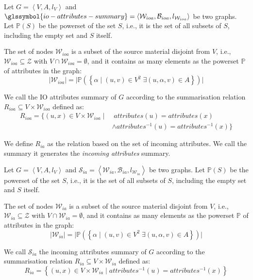 \begin{definition}
	Let $G=\left\langle V, A, l_V \right\rangle$ and $\glssymbol{io-attributes-summary} = \left\langle \mathcal{W}_{ioa}, \mathcal{B}_{ioa}, l_{\mathcal{W}_{ioa}} \right\rangle$ be two graphs. Let $\mathbb{P}(S)$ be the powerset of the set $S$, i.e., it is the set of all subsets of $S$, including the empty set and $S$ itself.

	The set of nodes $\mathcal{W}_{ioa}$ is a subset of the source material disjoint from $V$, i.e., $\mathcal{W}_{ioa} \subseteq \mathcal{Z}$ with $V \cap \mathcal{W}_{ioa} = \emptyset$, and it contains as many elements as the powerset $\mathbb{P}$ of attributes in the graph:
	$$
	\lvert \mathcal{W}_{ioa} \rvert = \lvert \mathbb{P}\left( \left\lbrace \alpha \mid (u, v) \in V^2\; \exists (u, \alpha, v) \in A \right\rbrace \right) \rvert
	$$

	We call  the IO attributes summary of $G$ according to the summarisation relation $R_{ioa} \subseteq V \times \mathcal{W}_{ioa}$ defined as:
	$$
	\begin{aligned}
	R_{ioa} =
	\{
	(u, x) \in V \times \mathcal{W}_{ioa} \mid &\; attributes(u) = attributes(x) \\
	& \wedge attributes^{-1}(u) = attributes^{-1}(x)
	\}
	\end{aligned}
	$$
	\label{chap4:summary:def:incoming--outgoing-attributes}
\end{definition}

\vspace{.5cm}


We define $R_{ia}$ as the relation based on the set of incoming \gls{attributes}. We call the summary it generates the \emph{incoming attributes} summary.

\begin{definition}
	Let $G=\left\langle V, A, l_V \right\rangle$ and $\mathcal{S}_{ia} = \left\langle \mathcal{W}_{ia}, \mathcal{B}_{ia}, l_{\mathcal{W}_{ia}} \right\rangle$ be two graphs. Let $\mathbb{P}(S)$ be the powerset of the set $S$, i.e., it is the set of all subsets of $S$, including the empty set and $S$ itself.

	The set of nodes $\mathcal{W}_{ia}$ is a subset of the source material disjoint from $V$, i.e., $\mathcal{W}_{ia} \subseteq \mathcal{Z}$ with $V \cap \mathcal{W}_{ia} = \emptyset$, and it contains as many elements as the powerset $\mathbb{P}$ of attributes in the graph:
	$$
	\lvert \mathcal{W}_{ia} \rvert = \lvert \mathbb{P}\left( \left\lbrace \alpha \mid (u, v) \in V^2\; \exists (u, \alpha, v) \in A \right\rbrace \right) \rvert
	$$

	We call $\mathcal{S}_{ia}$ the incoming attributes summary of $G$ according to the summarisation relation $R_{ia} \subseteq V \times \mathcal{W}_{ia}$ defined as:
	$$
	R_{ia} = \left\lbrace (u, x) \in V \times \mathcal{W}_{ia} \mid attributes^{-1}(u) = attributes^{-1}(x) \right\rbrace
	$$
	\label{chap4:summary:def:incoming-attributes}
\end{definition}

